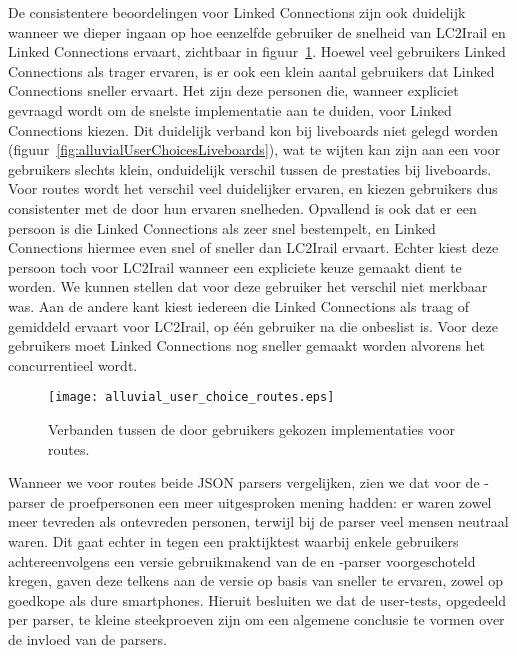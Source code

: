 De consistentere beoordelingen voor Linked Connections zijn ook duidelijk wanneer we dieper ingaan op hoe eenzelfde gebruiker de snelheid van LC2Irail en Linked Connections ervaart, zichtbaar in figuur~\ref{fig:alluvialUserChoicesRoutes}. Hoewel veel gebruikers Linked Connections als trager ervaren, is er ook een klein aantal gebruikers dat Linked Connections sneller ervaart. Het zijn deze personen die, wanneer expliciet gevraagd wordt om de snelste implementatie aan te duiden, voor Linked Connections kiezen. Dit duidelijk verband kon bij liveboards niet gelegd worden (figuur~\ref{fig:alluvialUserChoicesLiveboards}), wat te wijten kan zijn aan een voor gebruikers slechts klein, onduidelijk verschil tussen de prestaties bij liveboards. Voor routes wordt het verschil veel duidelijker ervaren, en kiezen gebruikers dus consistenter met de door hun ervaren snelheden.
Opvallend is ook dat er een persoon is die Linked Connections als zeer snel bestempelt, en Linked Connections hiermee even snel of sneller dan LC2Irail ervaart. Echter kiest deze persoon toch voor LC2Irail wanneer een expliciete keuze gemaakt dient te worden. We kunnen stellen dat voor deze gebruiker het verschil niet merkbaar was. Aan de andere kant kiest iedereen die Linked Connections als traag of gemiddeld ervaart voor LC2Irail, op één gebruiker na die onbeslist is. Voor deze gebruikers moet Linked Connections nog sneller gemaakt worden alvorens het concurrentieel wordt.

\begin{figure}[ht]
	\centering
	\texttt{[image: alluvial\_user\_choice\_routes.eps]}
	\caption[Door gebruikers gekozen implementatie voor routes]{Verbanden tussen de door gebruikers gekozen implementaties voor routes. }
	\label{fig:alluvialUserChoicesRoutes}
\end{figure}

Wanneer we voor routes beide JSON parsers vergelijken, zien we dat voor de -parser de proefpersonen een meer uitgesproken mening hadden: er waren zowel meer tevreden als ontevreden personen, terwijl bij de  parser veel mensen neutraal waren. Dit gaat echter in tegen een praktijktest waarbij enkele gebruikers achtereenvolgens een versie gebruikmakend van de  en -parser voorgeschoteld kregen, gaven deze telkens aan de versie op basis van  sneller te ervaren, zowel op goedkope als dure smartphones. Hieruit besluiten we dat de user-tests, opgedeeld per parser, te kleine steekproeven zijn om een algemene conclusie te vormen over de invloed van de parsers.

